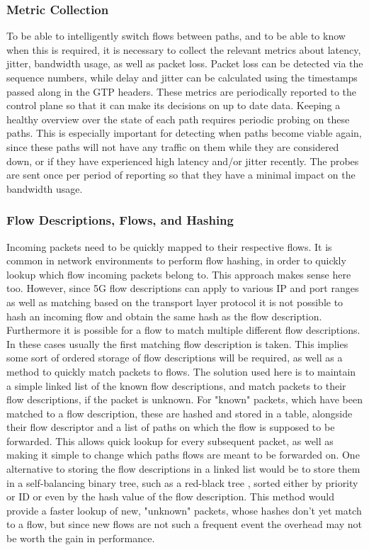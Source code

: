 \subsubsection{Metric Collection}

To be able to intelligently switch flows between paths, and to be able to know when this is required, it is necessary to collect the relevant metrics about latency, jitter, bandwidth usage, as well as packet loss. Packet loss can be detected via the sequence numbers, while delay and jitter can be calculated using the timestamps passed along in the GTP headers. These metrics are periodically reported to the control plane so that it can make its decisions on up to date data. Keeping a healthy overview over the state of each path requires periodic probing on these paths. This is especially important for detecting when paths become viable again, since these paths will not have any traffic on them while they are considered down, or if they have experienced high latency and/or jitter recently. The probes are sent once per period of reporting so that they have a minimal impact on the bandwidth usage.

\subsubsection{Flow Descriptions, Flows, and Hashing}

Incoming packets need to be quickly mapped to their respective flows. It is common in network environments to perform flow hashing, in order to quickly lookup which flow incoming packets belong to. This approach makes sense here too. However, since 5G flow descriptions can apply to various IP and port ranges as well as matching based on the transport layer protocol it is not possible to hash an incoming flow and obtain the same hash as the flow description. Furthermore it is possible for a flow to match multiple different flow descriptions. In these cases usually the first matching flow description is taken. This implies some sort of ordered storage of flow descriptions will be required, as well as a method to quickly match packets to flows. The solution used here is to maintain a simple linked list of the known flow descriptions, and match packets to their flow descriptions, if the packet is unknown. For "known" packets, which have been matched to a flow description, these are hashed and stored in a table, alongside their flow descriptor and a list of paths on which the flow is supposed to be forwarded. This allows quick lookup for every subsequent packet, as well as making it simple to change which paths flows are meant to be forwarded on. One alternative to storing the flow descriptions in a linked list would be to store them in a self-balancing binary tree, such as a red-black tree \cite{red-black-trees}, sorted either by priority or ID or even by the hash value of the flow description. This method would provide a faster lookup of new, "unknown" packets, whose hashes don't yet match to a flow, but since new flows are not such a frequent event the overhead may not be worth the gain in performance.

